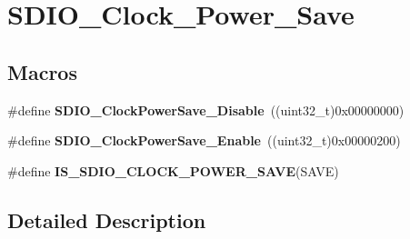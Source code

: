 \hypertarget{group___s_d_i_o___clock___power___save}{\section{S\-D\-I\-O\-\_\-\-Clock\-\_\-\-Power\-\_\-\-Save}
\label{group___s_d_i_o___clock___power___save}
}
\subsection*{Macros}
\begin{DoxyCompactItemize}
\item 
\hypertarget{group___s_d_i_o___clock___power___save_ga032aa5fb2dfd7ba5dbd60a3845c82ba0}{\#define {\bfseries S\-D\-I\-O\-\_\-\-Clock\-Power\-Save\-\_\-\-Disable}~((uint32\-\_\-t)0x00000000)}\label{group___s_d_i_o___clock___power___save_ga032aa5fb2dfd7ba5dbd60a3845c82ba0}

\item 
\hypertarget{group___s_d_i_o___clock___power___save_ga9f5b66a0044c4ff36a3eb1ec758f7ea7}{\#define {\bfseries S\-D\-I\-O\-\_\-\-Clock\-Power\-Save\-\_\-\-Enable}~((uint32\-\_\-t)0x00000200)}\label{group___s_d_i_o___clock___power___save_ga9f5b66a0044c4ff36a3eb1ec758f7ea7}

\item 
\#define {\bfseries I\-S\-\_\-\-S\-D\-I\-O\-\_\-\-C\-L\-O\-C\-K\-\_\-\-P\-O\-W\-E\-R\-\_\-\-S\-A\-V\-E}(S\-A\-V\-E)
\end{DoxyCompactItemize}


\subsection{Detailed Description}


